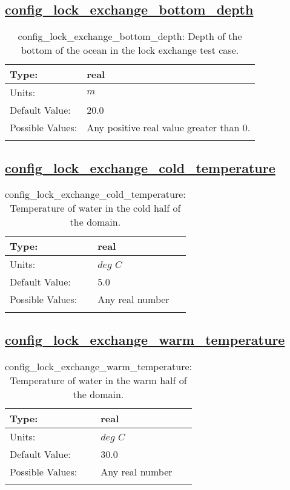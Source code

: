 \subsection[config\_lock\_exchange\_bottom\_depth]{\hyperref[sec:nm_tab_lock_exchange]{config\_lock\_exchange\_bottom\_depth}}
\label{subsec:nm_sec_config_lock_exchange_bottom_depth}
\begin{center}
\begin{longtable}{| p{2.0in} || p{4.0in} |}
    \hline
    Type: & real \\
    \hline
    Units: & $m$ \\
    \hline
    Default Value: & 20.0 \\
    \hline
    Possible Values: & Any positive real value greater than 0. \\
    \hline
    \caption{config\_lock\_exchange\_bottom\_depth: Depth of the bottom of the ocean in the lock exchange test case.}
\end{longtable}
\end{center}
\subsection[config\_lock\_exchange\_cold\_temperature]{\hyperref[sec:nm_tab_lock_exchange]{config\_lock\_exchange\_cold\_temperature}}
\label{subsec:nm_sec_config_lock_exchange_cold_temperature}
\begin{center}
\begin{longtable}{| p{2.0in} || p{4.0in} |}
    \hline
    Type: & real \\
    \hline
    Units: & $deg$ $C$ \\
    \hline
    Default Value: & 5.0 \\
    \hline
    Possible Values: & Any real number \\
    \hline
    \caption{config\_lock\_exchange\_cold\_temperature: Temperature of water in the cold half of the domain.}
\end{longtable}
\end{center}
\subsection[config\_lock\_exchange\_warm\_temperature]{\hyperref[sec:nm_tab_lock_exchange]{config\_lock\_exchange\_warm\_temperature}}
\label{subsec:nm_sec_config_lock_exchange_warm_temperature}
\begin{center}
\begin{longtable}{| p{2.0in} || p{4.0in} |}
    \hline
    Type: & real \\
    \hline
    Units: & $deg$ $C$ \\
    \hline
    Default Value: & 30.0 \\
    \hline
    Possible Values: & Any real number \\
    \hline
    \caption{config\_lock\_exchange\_warm\_temperature: Temperature of water in the warm half of the domain.}
\end{longtable}
\end{center}
